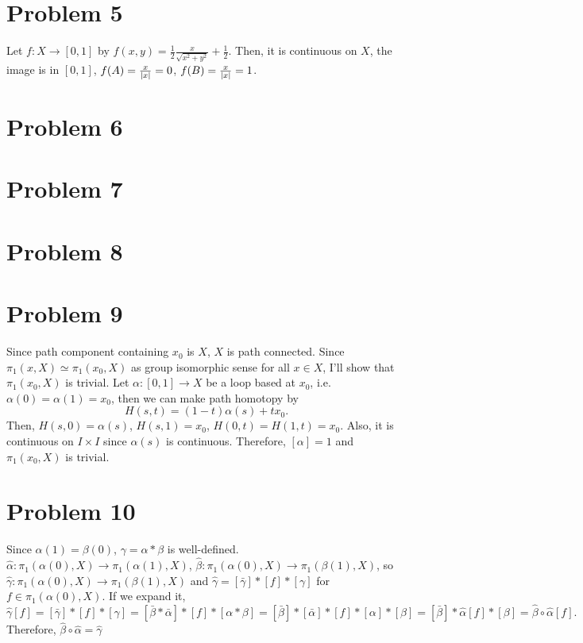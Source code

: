 \documentclass{article}
\begin{document}
\section*{Problem 5}
Let $f:X\rightarrow[0,1]$ by $f(x,y)=\frac{1}{2}\frac{x}{\sqrt{x^2+y^2}}+\frac{1}{2}$. Then, it is continuous on $X$, the image is in $[0,1]$, $f(A)=\frac{x}{\abs{x}}=0$, $f(B)=\frac{x}{\abs{x}}=1$.
\section*{Problem 6}
\section*{Problem 7}
\section*{Problem 8}
\section*{Problem 9}
Since path component containing $x_0$ is $X$, $X$ is path connected. Since $\pi_1(x, X)\simeq \pi_1(x_0, X)$ as group isomorphic sense for all $x\in X$, I'll show that $\pi_1(x_0, X)$ is trivial. Let $\alpha:[0,1]\rightarrow X$ be a loop based at $x_0$, i.e. $\alpha(0)=\alpha(1)=x_0$, then we can make path homotopy by
\begin{equation*}
H(s, t)=(1-t)\alpha(s)+tx_0.
\end{equation*}
Then, $H(s, 0)=\alpha(s)$, $H(s, 1)=x_0$, $H(0, t)=H(1, t)=x_0$. Also, it is continuous on $I\times I$ since $\alpha(s)$ is continuous. Therefore, $[\alpha]=1$ and $\pi_1(x_0, X)$ is trivial.
\section*{Problem 10}
Since $\alpha(1)=\beta(0)$, $\gamma=\alpha*\beta$ is well-defined. $\hat{\alpha}:\pi_1(\alpha(0), X)\rightarrow \pi_1(\alpha(1), X)$, $\hat{\beta}:\pi_1(\alpha(0), X)\rightarrow \pi_1(\beta(1), X)$, so $\hat{\gamma}:\pi_1(\alpha(0), X)\rightarrow \pi_1(\beta(1), X)$ and $\hat{\gamma}=[\bar{\gamma}]*[f]*[\gamma]$ for $f\in\pi_1(\alpha(0), X)$. If we expand it,
\begin{equation*}
\hat{\gamma}[f]=[\bar{\gamma}]*[f]*[\gamma]=[\bar{\beta}*\bar{\alpha}]*[f]*[\alpha*\beta]=[\bar{\beta}]*[\bar{\alpha}]*[f]*[\alpha]*[\beta]=[\bar{\beta}]*\hat{\alpha}[f]*[\beta]=\hat{\beta}\circ \hat{\alpha}[f].
\end{equation*}
Therefore, $\hat{\beta}\circ \hat{\alpha}=\hat{\gamma}$
\end{document}
